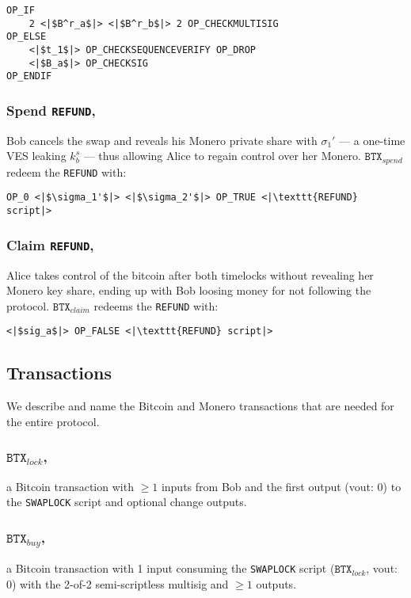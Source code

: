 \documentclass{llncs}
\newcommand{\BTX}{\texttt{BTX}}
\begin{document}
\begin{verbatim}
OP_IF
    2 <|$B^r_a$|> <|$B^r_b$|> 2 OP_CHECKMULTISIG
OP_ELSE
    <|$t_1$|> OP_CHECKSEQUENCEVERIFY OP_DROP
    <|$B_a$|> OP_CHECKSIG
OP_ENDIF
\end{verbatim}

\subsubsection{Spend \texttt{REFUND},}
Bob cancels the swap and reveals his Monero private share with $\sigma_1'$ --- a one-time VES leaking $k^s_b$ --- thus allowing Alice to regain control over her Monero. $\BTX_\textit{spend}$ redeem the \texttt{REFUND} with:

\begin{verbatim}
OP_0 <|$\sigma_1'$|> <|$\sigma_2'$|> OP_TRUE <|\texttt{REFUND} script|>
\end{verbatim}

\subsubsection{Claim \texttt{REFUND},}
Alice takes control of the bitcoin after both timelocks without revealing her Monero key share, ending up with Bob loosing money for not following the protocol. $\BTX_\textit{claim}$ redeems the \texttt{REFUND} with:

\begin{verbatim}
<|$sig_a$|> OP_FALSE <|\texttt{REFUND} script|>
\end{verbatim}

\subsection{Transactions}
We describe and name the Bitcoin and Monero transactions that are needed for the entire protocol.

\subsubsection{$\BTX_\textit{lock}$,}
a Bitcoin transaction with $\geq 1$ inputs from Bob and the first output (vout: 0) to the \texttt{SWAPLOCK} script and optional change outputs.

\subsubsection{$\BTX_\textit{buy}$,}
a Bitcoin transaction with 1 input consuming the \texttt{SWAPLOCK} script ($\BTX_\textit{lock}$, vout: 0) with the 2-of-2 semi-scriptless multisig and $\geq 1$ outputs.
\end{document}
